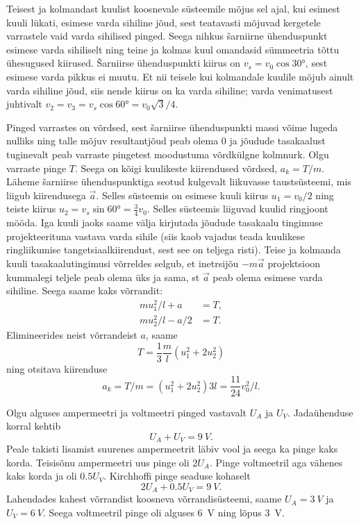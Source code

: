 \documentclass[10pt, twoside]{article}
\begin{document}
{
\solu
Teisest ja kolmandast kuulist koosnevale süsteemile mõjus sel ajal, kui esimest kuuli lükati, esimese varda sihiline jõud, sest teatavasti mõjuvad kergetele varrastele vaid varda sihilised pinged. Seega nihkus šarniirne ühenduspunkt esimese varda sihiliselt ning teine ja kolmas kuul omandasid sümmeetria tõttu ühesugused kiirused. Šarniirse ühenduspunkti kiirus on $v_s = v_0 \cos \ang{30}$, sest esimese varda pikkus ei muutu. Et nii teisele kui kolmandale kuulile mõjub ainult varda sihiline jõud, siis nende kiirus on ka varda sihiline; varda venimatusest juhtivalt $v_2 = v_3 = v_s \cos \ang{60} = v_0 \sqrt 3/4$.

Pinged varrastes on võrdsed, sest šarniirse ühenduspunkti massi võime lugeda nulliks ning talle mõjuv resultantjõud peab olema 0 ja jõudude tasakaalust tuginevalt peab varraste pingetest moodustuma võrdkülgne kolmnurk. Olgu varraste pinge $T$. Seega on kõigi kuulikeste kiirendused võrdsed, $a_k = T /m$. Läheme šarniirse ühenduspunktiga seotud kulgevalt liikuvasse taustsüsteemi, mis liigub kiirendusega $\vec a$. Selles süsteemis on esimese kuuli kiirus $u_1 = v_0/2$ ning teiste kiirus $u_2 = v_s \sin \ang{60} = \frac{3}{4} v_0$. Selles süsteemis liiguvad kuulid ringjoont mööda. Iga kuuli jaoks saame välja kirjutada jõudude tasakaalu tingimuse projekteerituna vastava varda sihile (siis kaob vajadus teada kuulikese ringliikumise tangetsiaalkiirendust, sest see on teljega risti). Teise ja kolmanda kuuli tasakaalutingimusi võrreldes selgub, et inetrsijõu $-m\vec a$ projektsioon kummalegi teljele peab olema üks ja sama, st $\vec a$ peab olema esimese varda sihiline. Seega saame kaks võrrandit:
\[
\begin{aligned}
mu_1^2/l + a &= T,\\
mu_2^2/l - a/2 &= T.
\end{aligned}
\]
Elimineerides neist võrrandeist $a$, saame
\[
T=\frac{1}{3} \frac{m}{l}\left(u_{1}^{2}+2 u_2^{2}\right)
\]
ning otsitava kiirenduse
\[
a_{k}=T / m=\left(u_{1}^{2}+2 u_2^{2}\right) 3 l=\frac{11}{24} v_{0}^{2} / l.
\]
\probend
\bigskip


\solu
Olgu alguses ampermeetri ja voltmeetri pinged vastavalt $U_A$ ja $U_V$. Jadaühenduse korral kehtib
\[
U_A + U_V = \SI{9}{V}.
\]
Peale takisti lisamist suurenes ampermeetrit läbiv vool ja seega ka pinge kaks korda. Teisisõnu ampermeetri uus pinge oli $2U_A$. Pinge voltmeetril aga vähenes kaks korda ja oli $\num{0,5}U_V$. Kirchhoffi pinge seaduse kohaselt
\[
2U_A + \num{0,5}U_V = \SI{9}{V}.
\]
Lahendades kahest võrrandist koosneva võrrandisüsteemi, saame $U_A = \SI{3}{V}$ ja $U_V = \SI{6}{V}$. Seega voltmeetril pinge oli alguses \SI{6}{V} ning lõpus \SI{3}{V}.
\probend
\bigskip

}
\end{document}
